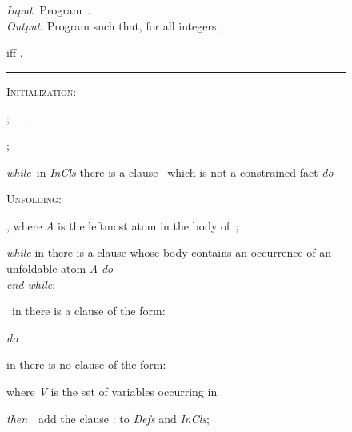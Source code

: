 \documentclass[english]{tlp}
\begin{document}
\begin{figure}[ht]
\begin{flushleft}
\begin{minipage}{124mm}
\noindent\hrulefill
	
	\noindent \emph{Input\/}: Program~.\\ 
	\noindent \emph{Output\/}: Program  such that,
for all integers ,
	 
	 iff 
.\\	
\noindent\rule{30mm}{0.1mm}
	
	\noindent \textsc{Initialization}:

\noindent\hspace{.6mm}
; ~~;

\noindent\hspace{.6mm}
;
	


	\noindent \textit{while}~in \textit{InCls} there is a clause~
	which is not a constrained fact
	\textit{do}
	
	\smallskip
	
	\hspace*{3mm}\begin{minipage}{118mm}
		
		\smallskip
		\noindent \textsc{Unfolding}:
		


		\noindent , 
		where \textit{A} is the leftmost atom in the body of~;
		
		
		\noindent \textit{while}
		\hangindent=8mm in  there is a clause 
		whose body contains an occurrence of an unfoldable atom \textit{A}
		\textit{do} 
		\\
		


		\noindent \textit{end-while};
		
		
		\smallskip
		
		
		\noindent
		\ in  there is a clause
		  of the form: 
		~~
		
		\noindent  
		\textit{do}
		
		\smallskip
		
		\hspace*{3mm}\begin{minipage}{115mm}
			
			\noindent
			in  there is no clause of the form:
			~~ 
			
			\hspace*{4mm}where {\it V} is the set of variables occurring in 
			
			
\noindent
			\textit{then}~~add the clause : 
			to \textit{Defs} and \textit{InCls};
						

\end{minipage}
\end{minipage}
\end{minipage}
\end{flushleft}
\end{figure}
\end{document}

